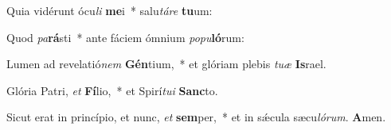 \item Quia vidérunt ócu\textit{li} \textbf{me}i~* salu\tinyhspace\textit{táre} \textbf{tu}um:
\item Quod \textit{pa}\textbf{rá}sti~* ante fáciem ómnium \textit{popu}\textbf{ló}rum:
\item Lumen ad revelatió\textit{nem} \textbf{Gén}tium,~* et glóriam plebis \textit{tuæ} \textbf{Is}rael.
\item Glória Patri, \textit{et} \textbf{Fí}lio,~* et Spirí\textit{tui} \textbf{Sanc}to.
\item Sicut erat in princípio, et nunc, \textit{et} \textbf{sem}per,~* et in sǽcula sæcu\tinyhspace\textit{lórum}. \textbf{A}men.
